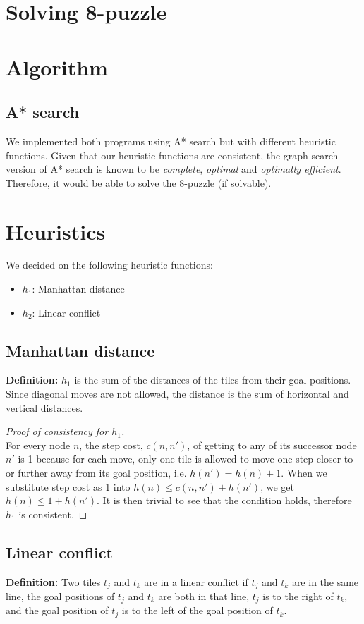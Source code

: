\documentclass[11pt, a4paper]{article}
\begin{document}
\section*{Solving 8-puzzle}
\section{Algorithm}
\subsection{A* search}
We implemented both programs using A* search but with different heuristic functions. Given that our heuristic functions are consistent, the graph-search version of A* search is known to be \textit{complete}, \textit{optimal} and \textit{optimally efficient}. Therefore, it would be able to solve the 8-puzzle (if solvable).

\section{Heuristics}
We decided on the following heuristic functions:
\begin{itemize}
	\item $h_1$: Manhattan distance
	\item $h_2$: Linear conflict
\end{itemize}

\subsection{Manhattan distance}
\textbf{Definition:} $h_1$ is the sum of the distances of the tiles from their goal positions. Since diagonal moves are not allowed, the distance is the sum of horizontal and vertical distances. 

\begin{proof}[Proof of consistency for $h_1$]
	$ $ \\
	For every node $n$, the step cost, $c(n, n')$, of getting to any of its successor node $n'$ is 1 because for each move, only one tile is allowed to move one step closer to or further away from its goal position, i.e. $h(n') = h(n) \pm 1$. When we substitute step cost as 1 into $h(n) \leq c(n, n') + h(n')$, we get $h(n) \leq 1 + h(n')$. It is then trivial to see that the condition holds, therefore $h_1$ is consistent.
\end{proof}

\subsection{Linear conflict}
\textbf{Definition:} Two tiles $t_j$ and $t_k$ are in a linear conflict if $t_j$ and $t_k$ are in the same line, the goal positions of $t_j$ and $t_k$ are both in that line, $t_j$ is to the right of $t_k$, and the goal position of $t_j$ is to the left of the goal position of $t_k$.\\
\end{document}
